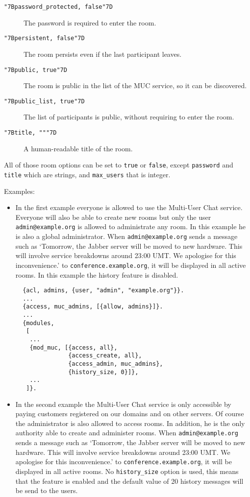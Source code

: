 \documentclass[a4paper,10pt]{book}
\newcommand{\bracehack}{\def\{{\char"7B}\def\}{\char"7D}}
\newcommand{\titem}[1]{\item[\bracehack\texttt{#1}]}
\newcommand{\jid}[1]{\texttt{#1}}
\newcommand{\term}[1]{\texttt{#1}}
\newcommand{\Jabber}{Jabber}
\begin{document}
\begin{description}
\begin{description}
  \titem{\{password\_protected, false\}} The password is required to enter the room.
  \titem{\{persistent, false\}} The room persists even if the last participant leaves.
  \titem{\{public, true\}} The room is public in the list of the MUC service, so it can be discovered.
  \titem{\{public\_list, true\}} The list of participants is public, without requiring to enter the room.
  \titem{\{title, ""\}} A human-readable title of the room.
  \end{description}
  All of those room options can be set to \term{true} or \term{false},
  except \term{password} and \term{title} which are strings,
  and \term{max\_users} that is integer.
\end{description}

Examples:
\begin{itemize}
\item In the first example everyone is allowed to use the Multi-User Chat
  service. Everyone will also be able to create new rooms but only the user
  \jid{admin@example.org} is allowed to administrate any room. In this
  example he is also a global administrator. When \jid{admin@example.org}
  sends a message such as `Tomorrow, the \Jabber{} server will be moved
  to new hardware. This will involve service breakdowns around 23:00 UMT.
  We apologise for this inconvenience.' to \jid{conference.example.org},
  it will be displayed in all active rooms. In this example the history
  feature is disabled.
  \begin{verbatim}
  {acl, admins, {user, "admin", "example.org"}}.
  ...
  {access, muc_admins, [{allow, admins}]}.
  ...
  {modules,
   [
    ...
    {mod_muc, [{access, all},
               {access_create, all},
               {access_admin, muc_admins},
               {history_size, 0}]},
    ...
   ]}.
\end{verbatim}
\item In the second example the Multi-User Chat service is only accessible by
  paying customers registered on our domains and on other servers. Of course
  the administrator is also allowed to access rooms. In addition, he is the
  only authority able to create and administer rooms. When
  \jid{admin@example.org} sends a message such as `Tomorrow, the \Jabber{}
  server will be moved to new hardware. This will involve service breakdowns
  around 23:00 UMT. We apologise for this inconvenience.' to
  \jid{conference.example.org}, it will be displayed in all active rooms. No
  \term{history\_size} option is used, this means that the feature is enabled
  and the default value of 20 history messages will be send to the users.

\end{itemize}
\end{document}
